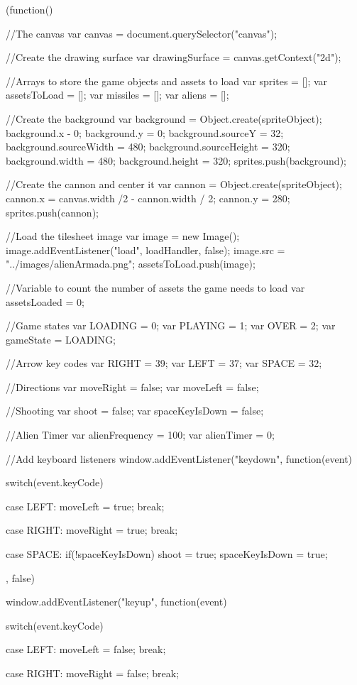 (function(){
	
	//The canvas
	var canvas = document.querySelector("canvas");
	
	//Create the drawing surface
	var drawingSurface = canvas.getContext("2d");
	
	//Arrays to store the game objects and assets to load
	var sprites = [];
	var assetsToLoad = [];
	var missiles = [];
	var aliens = [];
	
	//Create the background
	var background = Object.create(spriteObject);
	background.x - 0;
	background.y = 0;
	background.sourceY = 32;
	background.sourceWidth = 480;
	background.sourceHeight = 320;
	background.width = 480;
	background.height = 320;
	sprites.push(background);
	
	//Create the cannon and center it
	var cannon = Object.create(spriteObject);
	cannon.x = canvas.width /2 - cannon.width / 2;
	cannon.y = 280;
	sprites.push(cannon);
	
	//Load the tilesheet image
	var image = new Image();
	image.addEventListener("load", loadHandler, false);
	image.src = "../images/alienArmada.png";
	assetsToLoad.push(image);
	
	//Variable to count the number of assets the game needs to load
	var assetsLoaded = 0;
	
	//Game states
	var LOADING = 0;
	var PLAYING = 1;
	var OVER = 2;
	var gameState = LOADING;
	
	//Arrow key codes
	var RIGHT = 39;
	var LEFT = 37;
	var SPACE = 32;
	
	//Directions
	var moveRight = false;
	var moveLeft = false;
	
	//Shooting
	var shoot = false;
	var spaceKeyIsDown = false;
	
	//Alien Timer
	var alienFrequency = 100;
	var alienTimer = 0;
	
	//Add keyboard listeners
	window.addEventListener("keydown", function(event)
	{
		switch(event.keyCode)
		{
			case LEFT:
				moveLeft = true;
				break;
			
			case RIGHT:
				moveRight = true;
				break;
				
			case SPACE:
				if(!spaceKeyIsDown)
				{
					shoot = true;
					spaceKeyIsDown = true;
				}
		}
	}, false)
	
	window.addEventListener("keyup", function(event)
	{
		switch(event.keyCode)
		{
			case LEFT:
				moveLeft = false;
				break;
			
			case RIGHT:
				moveRight = false;
				break;
				
}}}
